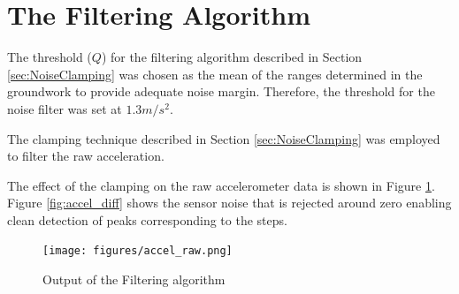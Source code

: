





\section{The Filtering Algorithm}

The threshold ($Q$) for the filtering algorithm described in Section 
\ref{sec:NoiseClamping} was chosen as the mean of the 
ranges determined in the groundwork to provide adequate noise margin. 
Therefore, the threshold for the noise filter was set at $1.3 m/s^2$.

The clamping technique described in Section \ref{sec:NoiseClamping} was employed
to filter the raw acceleration.

The effect of the clamping on the raw accelerometer data is shown in 
Figure \ref{fig:accel_raw}. Figure \ref{fig:accel_diff} shows the sensor noise
that is rejected around zero enabling clean detection of peaks corresponding to
the steps.

\begin{figure}[tbph]
    \centering
    \texttt{[image: figures/accel\_raw.png]}
    \caption{Output of the Filtering algorithm \label{fig:accel_raw}}
\end{figure}

